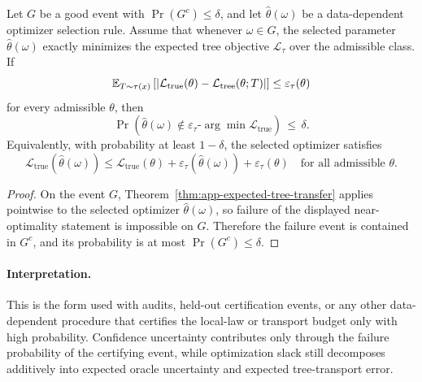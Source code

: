 \begin{theorem}
\label{thm:app-expected-tree-transfer-hp}
Let $G$ be a good event with $\Pr(G^c)\le \delta$, and let
$\widehat{\theta}(\omega)$ be a data-dependent optimizer selection rule. Assume
that whenever $\omega \in G$, the selected parameter
$\widehat{\theta}(\omega)$ exactly minimizes the expected tree objective
$\widehat{\mathcal{L}}_{\tau}$ over the admissible class. If
\[
\mathbb{E}_{T \sim \tau(x)}
\left[
  \left|
    \mathcal{L}_{\mathrm{true}}(\theta) -
    \mathcal{L}_{\mathrm{tree}}(\theta;T)
  \right|
\right]
\le \varepsilon_{\tau}(\theta)
\]
for every admissible $\theta$, then
\[
\Pr\!\left(
\widehat{\theta}(\omega)
\notin
\varepsilon_{\tau}\text{-}\arg\min \mathcal{L}_{\mathrm{true}}
\right)
\,\le\,
\delta.
\]
Equivalently, with probability at least $1-\delta$, the selected optimizer
satisfies
\[
\mathcal{L}_{\mathrm{true}}(\widehat{\theta}(\omega))
\le
\mathcal{L}_{\mathrm{true}}(\theta)
  + \varepsilon_{\tau}(\widehat{\theta}(\omega))
  + \varepsilon_{\tau}(\theta)
\quad
\text{for all admissible } \theta.
\]
\end{theorem}

\begin{proof}
On the event $G$, Theorem~\ref{thm:app-expected-tree-transfer} applies
pointwise to the selected optimizer $\widehat{\theta}(\omega)$, so failure of
the displayed near-optimality statement is impossible on $G$. Therefore the
failure event is contained in $G^c$, and its probability is at most
$\Pr(G^c)\le \delta$.
\end{proof}

\paragraph{Interpretation.}
This is the form used with audits, held-out certification events, or any other
data-dependent procedure that certifies the local-law or transport budget only
with high probability. Confidence uncertainty contributes only through the
failure probability of the certifying event, while optimization slack still
decomposes additively into expected oracle uncertainty and expected
tree-transport error.

